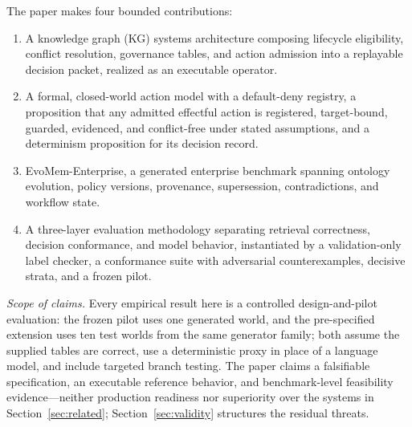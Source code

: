 \documentclass[conference]{IEEEtran}
\begin{document}
The paper makes four bounded contributions:
\begin{enumerate}
\item A knowledge graph (KG) systems architecture composing lifecycle eligibility, conflict resolution, governance tables, and action admission into a replayable decision packet, realized as an executable operator.
\item A formal, closed-world action model with a default-deny registry, a proposition that any admitted effectful action is registered, target-bound, guarded, evidenced, and conflict-free under stated assumptions, and a determinism proposition for its decision record.
\item EvoMem-Enterprise, a generated enterprise benchmark spanning ontology evolution, policy versions, provenance, supersession, contradictions, and workflow state.
\item A three-layer evaluation methodology separating retrieval correctness, decision conformance, and model behavior, instantiated by a validation-only label checker, a conformance suite with adversarial counterexamples, decisive strata, and a frozen pilot.
\end{enumerate}

\emph{Scope of claims.} Every empirical result here is a controlled design-and-pilot evaluation: the frozen pilot uses one generated world, and the pre-specified extension uses ten test worlds from the same generator family; both assume the supplied tables are correct, use a deterministic proxy in place of a language model, and include targeted branch testing. The paper claims a falsifiable specification, an executable reference behavior, and benchmark-level feasibility evidence---neither production readiness nor superiority over the systems in Section~\ref{sec:related}; Section~\ref{sec:validity} structures the residual threats.
\end{document}
